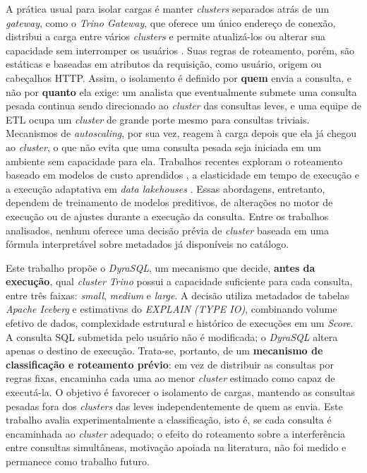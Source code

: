 A prática usual para isolar cargas é manter \textit{clusters} separados atrás de um \textit{gateway}, como o \textit{Trino Gateway}, que oferece um único endereço de conexão, distribui a carga entre vários \textit{clusters} e permite atualizá-los ou alterar sua capacidade sem interromper os usuários \cite{trinogateway}. Suas regras de roteamento, porém, são estáticas e baseadas em atributos da requisição, como usuário, origem ou cabeçalhos HTTP. Assim, o isolamento é definido por \textbf{quem} envia a consulta, e não por \textbf{quanto} ela exige: um analista que eventualmente submete uma consulta pesada continua sendo direcionado ao \textit{cluster} das consultas leves, e uma equipe de ETL ocupa um \textit{cluster} de grande porte mesmo para consultas triviais. Mecanismos de \textit{autoscaling}, por sua vez, reagem à carga depois que ela já chegou ao \textit{cluster}, o que não evita que uma consulta pesada seja iniciada em um ambiente sem capacidade para ela. Trabalhos recentes exploram o roteamento baseado em modelos de custo aprendidos \cite{strausz2025}, a elasticidade em tempo de execução \cite{zhang2025} e a execução adaptativa em \textit{data lakehouses} \cite{xue2024}. Essas abordagens, entretanto, dependem de treinamento de modelos preditivos, de alterações no motor de execução ou de ajustes durante a execução da consulta. Entre os trabalhos analisados, nenhum oferece uma decisão prévia de \textit{cluster} baseada em uma fórmula interpretável sobre metadados já disponíveis no catálogo.

Este trabalho propõe o \textit{DyraSQL}, um mecanismo que decide, \textbf{antes da execução}, qual \textit{cluster} \textit{Trino} possui a capacidade suficiente para cada consulta, entre três faixas: \textit{small}, \textit{medium} e \textit{large}. A decisão utiliza metadados de tabelas \textit{Apache Iceberg} e estimativas do \textit{EXPLAIN (TYPE IO)}, combinando volume efetivo de dados, complexidade estrutural e histórico de execuções em um \textit{Score}. A consulta SQL submetida pelo usuário não é modificada; o \textit{DyraSQL} altera apenas o destino de execução. Trata-se, portanto, de um \textbf{mecanismo de classificação e roteamento prévio}: em vez de distribuir as consultas por regras fixas, encaminha cada uma ao menor \textit{cluster} estimado como capaz de executá-la. O objetivo é favorecer o isolamento de cargas, mantendo as consultas pesadas fora dos \textit{clusters} das leves independentemente de quem as envia. Este trabalho avalia experimentalmente a classificação, isto é, se cada consulta é encaminhada ao \textit{cluster} adequado; o efeito do roteamento sobre a interferência entre consultas simultâneas, motivação apoiada na literatura, não foi medido e permanece como trabalho futuro.

